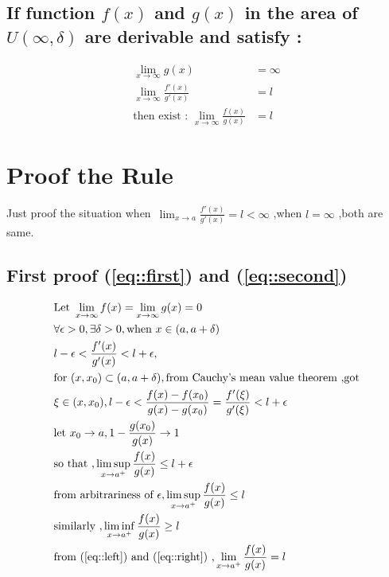 \documentclass{ctexart}
\begin{document}
\subsection{If function $f(x)$ and $g(x)$ in the area of $U(\infty,\delta)$ are derivable and satisfy :}
\begin{align}
\lim_{x \rightarrow \infty}g(x)&=\infty\label{eq::third}\\
\lim_{x \rightarrow \infty}\frac{f'(x)}{g'(x)}&=l \\
\text{then exist : }\lim_{x \rightarrow \infty}\frac{f(x)}{g(x)}&=l
\end{align}


\section{Proof the Rule}
Just proof the situation when~$\lim_{x \rightarrow a}\frac{f'(x)}{g'(x)}=l<\infty$ ,when $l=\infty$ ,both are same.

\subsection{First proof (\ref{eq::first}) and (\ref{eq::second})}
\begin{align}
&\text{Let }\lim_{x \rightarrow \infty}f(x)=\lim_{x \rightarrow \infty}g(x)=0\notag \\
&\forall\epsilon>0 ,\exists\delta>0 ,\text{when }x\in(a,a+\delta)\notag \\
&l-\epsilon<\frac{f'(x)}{g'(x)}<l+\epsilon ,\\
&\text{for }(x,x_0)\subset(a,a+\delta) ,\text{from Cauchy's mean value theorem ,got}\notag\\
&\xi\in(x,x_0),l-\epsilon<\frac{f(x)-f(x_0)}{g(x)-g(x_0)}=\frac{f'(\xi)}{g'(\xi)}<l+\epsilon\\
&\text{let }x_0 \rightarrow a ,1-\frac{g(x_0)}{g(x)} \rightarrow 1\\
&\text{so that ,}\limsup_{x \rightarrow a^+}\frac{f(x)}{g(x)}\le l+\epsilon \\
&\text{from arbitrariness of }\epsilon ,\limsup_{x \rightarrow a^+}\frac{f(x)}{g(x)} \le l \label{eq::left}\\
&\text{similarly ,}\liminf_{x \rightarrow a^+}\frac{f(x)}{g(x)} \ge l \label{eq::right}\\
&\text{from (\ref{eq::left}) and (\ref{eq::right}) ,}\lim_{x \rightarrow a^+}\frac{f(x)}{g(x)}=l 
\end{align}
\end{document}
